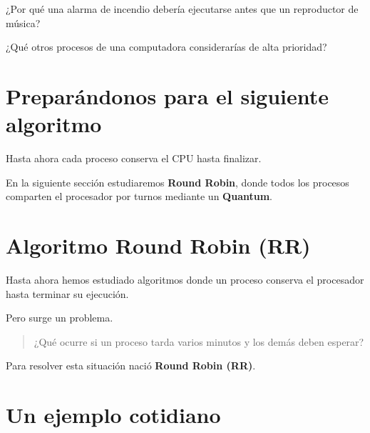 \documentclass[
  spanish,
  letterpaper,
]{scrbook}
\begin{document}
\begin{tcolorbox}[enhanced jigsaw, arc=.35mm, bottomrule=.15mm, bottomtitle=1mm, breakable, colback=white, colbacktitle=quarto-callout-tip-color!10!white, colframe=quarto-callout-tip-color-frame, coltitle=black, left=2mm, leftrule=.75mm, opacityback=0, opacitybacktitle=0.6, rightrule=.15mm, title=\textcolor{quarto-callout-tip-color}{\faLightbulb}\hspace{0.5em}{Reflexiona}, titlerule=0mm, toprule=.15mm, toptitle=1mm]

¿Por qué una alarma de incendio debería ejecutarse antes que un
reproductor de música?

¿Qué otros procesos de una computadora considerarías de alta prioridad?

\end{tcolorbox}


\chapter{Preparándonos para el siguiente
algoritmo}\label{preparuxe1ndonos-para-el-siguiente-algoritmo-2}

Hasta ahora cada proceso conserva el CPU hasta finalizar.

En la siguiente sección estudiaremos \textbf{Round Robin}, donde todos
los procesos comparten el procesador por turnos mediante un
\textbf{Quantum}.


\chapter{Algoritmo Round Robin (RR)}\label{algoritmo-round-robin-rr}

Hasta ahora hemos estudiado algoritmos donde un proceso conserva el
procesador hasta terminar su ejecución.

Pero surge un problema.

\begin{quote}
¿Qué ocurre si un proceso tarda varios minutos y los demás deben
esperar?
\end{quote}

Para resolver esta situación nació \textbf{Round Robin (RR)}.


\chapter{Un ejemplo cotidiano}\label{un-ejemplo-cotidiano-3}
\end{document}

